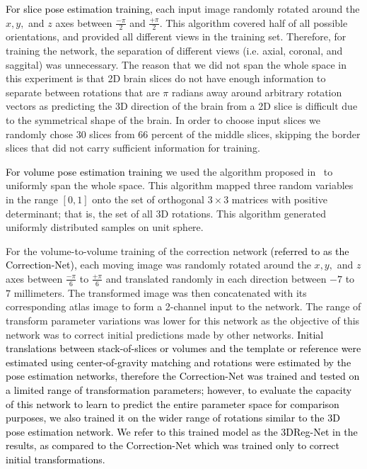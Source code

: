 \documentclass[journal,transmag]{IEEEtran}
\begin{document}
\textcolor{black}{For slice pose estimation training,} each input image randomly rotated around the $x, y,$ and $z$ axes between $\frac{-\pi}{2}$ and $\frac{+\pi}{2}$. This algorithm covered half of all possible orientations, and provided all different views in the training set. Therefore, for training the network, the separation of different views (i.e. axial, coronal, and saggital) was unnecessary. The reason that we did not span the whole space in this experiment is that 2D brain slices do not have enough information to separate between rotations that are $\pi$ radians away around arbitrary rotation vectors as predicting the 3D direction of the brain from a 2D slice is difficult due to the symmetrical shape of the brain. In order to choose input slices we randomly chose 30 slices from 66 percent of the middle slices, skipping the border slices that did not carry sufficient information for training.

\textcolor{black}{For volume pose estimation training} %
we used the algorithm proposed in~\cite[p.~355]{arvo2013graphics} to uniformly span the whole space. This algorithm mapped three random variables in the range $[0,1]$ onto the set of orthogonal $3\times3$ matrices with positive determinant; that is, the set of all 3D rotations. %
This algorithm generated uniformly distributed samples on unit sphere.

For the volume-to-volume training of the correction network \textcolor{black}{(referred to as the Correction-Net),} each moving image was randomly rotated around the $x, y,$ and $z$ axes between $\frac{-\pi}{6}$ to $\frac{+\pi}{6}$ and translated randomly in each direction between $-7$ to $7$ millimeters. The transformed image was then concatenated with its corresponding atlas image to form a 2-channel input to the network. The range of transform parameter variations was lower for this network as the objective of this network was to correct initial predictions made by other networks. \textcolor{black}{Initial translations between stack-of-slices or volumes and the template or reference were estimated using center-of-gravity matching and rotations were estimated by the pose estimation networks, therefore the Correction-Net was trained and tested on a limited range of transformation parameters; however, to evaluate the capacity of this network to learn to predict the entire parameter space for comparison purposes, we also trained it on the wider range of rotations similar to the 3D pose estimation network.  
We refer to this trained model as the 3DReg-Net in the results, as compared to the Correction-Net which was trained only to correct initial transformations.}
\end{document}
